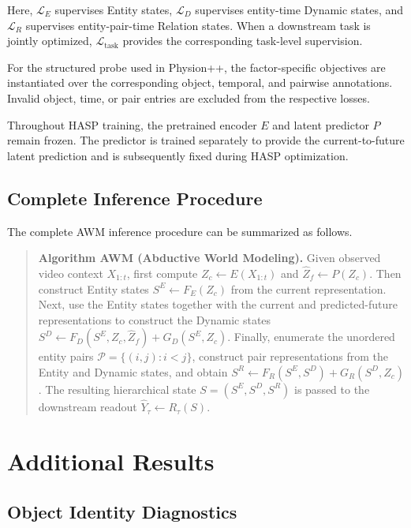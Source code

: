 \documentclass{article}
\begin{document}
Here, $\mathcal L_E$ supervises Entity states, $\mathcal L_D$ supervises entity-time Dynamic states, and $\mathcal L_R$ supervises entity-pair-time Relation states. When a downstream task is jointly optimized, $\mathcal L_{\mathrm{task}}$ provides the corresponding task-level supervision.

For the structured probe used in Physion++, the factor-specific objectives are instantiated over the corresponding object, temporal, and pairwise annotations. Invalid object, time, or pair entries are excluded from the respective losses.

Throughout HASP training, the pretrained encoder $E$ and latent predictor $P$ remain frozen. The predictor is trained separately to provide the current-to-future latent prediction and is subsequently fixed during HASP optimization.

\subsection{Complete Inference Procedure}
\label{app:inference-procedure}

The complete AWM inference procedure can be summarized as follows.

\begin{quote}
\textbf{Algorithm AWM (Abductive World Modeling).}
Given observed video context $X_{1:t}$, first compute
$Z_c\gets E(X_{1:t})$ and
$\widehat Z_f\gets P(Z_c)$.
Then construct Entity states
$S^E\gets F_E(Z_c)$
from the current representation. Next, use the Entity states together with the current and predicted-future representations to construct the Dynamic states
$S^D\gets F_D(S^E,Z_c,\widehat Z_f)+G_D(S^E,Z_c)$.
Finally, enumerate the unordered entity pairs
$\mathcal P=\{(i,j):i<j\}$,
construct pair representations from the Entity and Dynamic states, and obtain
$S^R\gets F_R(S^E,S^D)+G_R(S^D,Z_c)$.
The resulting hierarchical state
$S=(S^E,S^D,S^R)$
is passed to the downstream readout
$\widehat Y_\tau\gets R_\tau(S)$.
\end{quote}

\section{Additional Results}
\label{app:experiment_detail}

\subsection{Object Identity Diagnostics}
\label{app:attributor-analysis}
\end{document}
